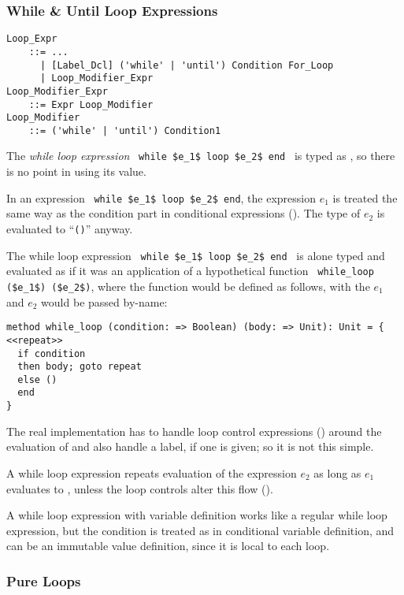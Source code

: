 \subsubsection{While \& Until Loop Expressions}

\grammar\begin{lstlisting}
Loop_Expr
    ::= ...
      | [Label_Dcl] ('while' | 'until') Condition For_Loop
      | Loop_Modifier_Expr
Loop_Modifier_Expr 
    ::= Expr Loop_Modifier
Loop_Modifier 
    ::= ('while' | 'until') Condition1
\end{lstlisting}

The {\em while loop expression} ~\lstinline!while $e_1$ loop $e_2$ end!~ is typed as , so there is no point in using its value. 

In an expression ~\lstinline!while $e_1$ loop $e_2$ end!, the expression $e_1$ is treated the same way as the condition part in conditional expressions (). The type of $e_2$ is evaluated to ``\lstinline!()!'' anyway.

The while loop expression ~\lstinline!while $e_1$ loop $e_2$ end!~ is alone typed and evaluated as if it was an application of a hypothetical function ~\lstinline!while_loop ($e_1$) ($e_2$)!, where the function  would be defined as follows, with the $e_1$ and $e_2$ would be passed by-name: 
\begin{lstlisting}
method while_loop (condition: => Boolean) (body: => Unit): Unit = {
<<repeat>>
  if condition 
  then body; goto repeat 
  else ()
  end
}
\end{lstlisting}
The real implementation has to handle loop control expressions () around the evaluation of  and also handle a label, if one is given; so it is not this simple. 

A while loop expression repeats evaluation of the expression $e_2$ as long as $e_1$ evaluates to , unless the loop controls alter this flow ().

A while loop expression with variable definition works like a regular while loop expression, but the condition is treated as in conditional variable definition, and can be an immutable value definition, since it is local to each loop. 





\subsubsection{Pure Loops}
\label{sec:pure-loops}

